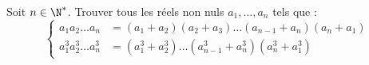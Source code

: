 Soit $n\in \N^*$. Trouver tous les réels non nuls $a_1, \dots, a_n$ tels que :
$$\begin{cases}
a_1 a_2\dots a_n       & = (a_1 + a_2)(a_2 + a_3)\dots (a_{n - 1} + a_n)(a_n + a_1) \\
a_1^3a_2^3 \dots a_n^3 & = (a_1^3 + a_2^3) \dots (a_{n - 1}^3 + a_n^3)(a_n^3 + a_1^3)
\end{cases}$$